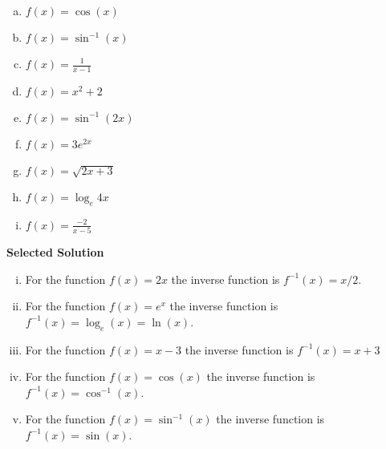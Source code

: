 \documentclass[a4paper,12pt]{article}
\begin{document}
\begin{enumerate}
\begin{multicols}{2}
\begin{enumerate}[(a)]
		\item	$f(x) =\cos(x)$
		\item	$f(x) = \sin^{-1}(x)$
		\item  ${f(x) = \displaystyle \frac{1}{x-1}}$
		
		\item	$f(x) = x^2+2$
		\item	$f(x) = \sin^{-1}(2x)$
		\item	$f(x) = 3 e^{2x}$
		\item $f(x) = \sqrt{2x+3}$
		\item $f(x) = \log_e{4x}$
		\item $ \displaystyle f(x) = \frac{-2}{x-5}$
	\end{enumerate}	
	\smallskip
\end{multicols}
\begin{framed}
\noindent \textbf{Selected Solution}
\begin{enumerate}[(i)]
	\item For the function $f(x) = 2x$ the inverse function is $f^{-1}(x) = x/2$.
	\item For the function	$f(x) =e^x$ the inverse function is  $f^{-1}(x) = \log_e(x) = \ln(x)$.
	\item For the function	$f(x) = x-3$ the inverse function is $f^{-1}(x) = x+3$
	
	\item For the function	$f(x) =\cos(x)$ the inverse function is $f^{-1}(x) = \cos^{-1}(x)$.
	\item For the function	$f(x) = \sin^{-1}(x)$ the inverse function is $f^{-1}(x) = \sin(x)$.
\end{enumerate}
\end{framed}
\end{enumerate}
\end{document}
